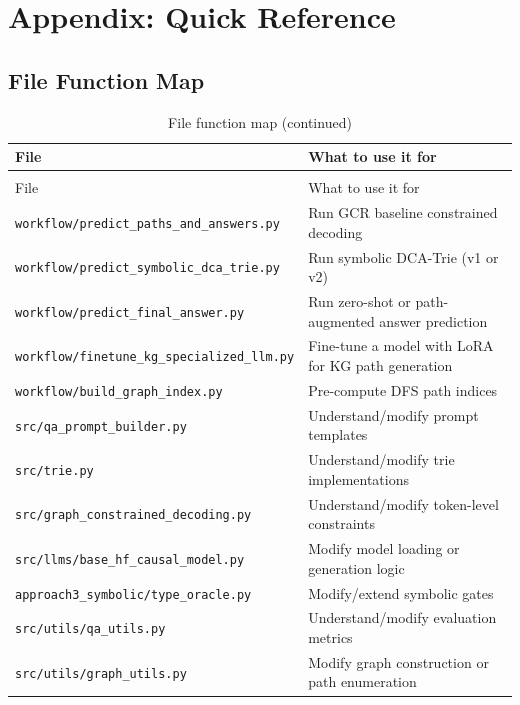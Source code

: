 \documentclass[11pt,a4paper,oneside,openany]{book}
\theoremstyle{definition}
\newcommand{\file}[1]{\texttt{#1}}
\begin{document}
\backmatter

\chapter{Appendix: Quick Reference}

\section{File Function Map}

\begin{longtable}{lp{8cm}}
	\caption{File function map}
	\label{tab:file-map}                                                                                   \\
	\toprule
	File                                              & What to use it for                                 \\
	\midrule
	\endfirsthead
	\caption[]{File function map (continued)}                                                              \\
	\toprule
	File                                              & What to use it for                                 \\
	\midrule
	\endhead
	\bottomrule
	\endfoot
	\file{workflow/predict\_paths\_and\_answers.py}   & Run GCR baseline constrained decoding              \\
	\file{workflow/predict\_symbolic\_dca\_trie.py}   & Run symbolic DCA-Trie (v1 or v2)                   \\
	\file{workflow/predict\_final\_answer.py}         & Run zero-shot or path-augmented answer prediction  \\
	\file{workflow/finetune\_kg\_specialized\_llm.py} & Fine-tune a model with LoRA for KG path generation \\
	\file{workflow/build\_graph\_index.py}            & Pre-compute DFS path indices                       \\
	\file{src/qa\_prompt\_builder.py}                 & Understand/modify prompt templates                 \\
	\file{src/trie.py}                                & Understand/modify trie implementations             \\
	\file{src/graph\_constrained\_decoding.py}        & Understand/modify token-level constraints          \\
	\file{src/llms/base\_hf\_causal\_model.py}        & Modify model loading or generation logic           \\
	\file{approach3\_symbolic/type\_oracle.py}        & Modify/extend symbolic gates                       \\
	\file{src/utils/qa\_utils.py}                     & Understand/modify evaluation metrics               \\
	\file{src/utils/graph\_utils.py}                  & Modify graph construction or path enumeration      \\
\end{longtable}
\end{document}
